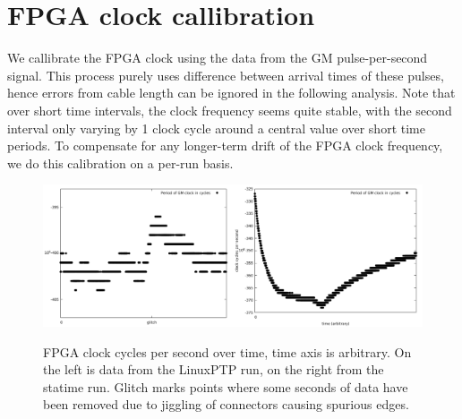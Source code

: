 \documentclass{article}
\begin{document}
\section{FPGA clock callibration}

We callibrate the FPGA clock using the data from the GM pulse-per-second signal. This process purely uses difference between arrival times of these pulses, hence errors from cable length can be ignored in the following analysis. Note that over short time intervals, the clock frequency seems quite stable, with the second interval only varying by 1 clock cycle around a central value over short time periods. To compensate for any longer-term drift of the FPGA clock frequency, we do this calibration on a per-run basis.

\begin{figure}[h]
\includegraphics[width=0.5\textwidth]{gm_clocks_overtime_ref.pdf}\includegraphics[width=0.5\textwidth]{gm_clocks_overtime_statime.pdf}
\caption{FPGA clock cycles per second over time, time axis is arbitrary. On the left is data from the LinuxPTP run, on the right from the statime run. Glitch marks points where some seconds of data have been removed due to jiggling of connectors causing spurious edges.}
\label{fig:gm_cycles_over_time}
\end{figure}
\end{document}
